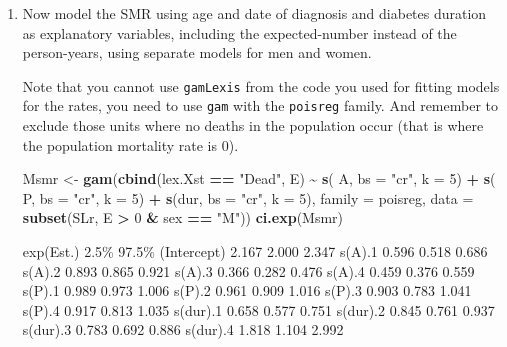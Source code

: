 \documentclass[
]{book}
\newenvironment{Shaded}{\begin{snugshade}}{\end{snugshade}}
\newcommand{\AttributeTok}[1]{\textcolor[rgb]{0.13,0.29,0.53}{#1}}
\newcommand{\DecValTok}[1]{\textcolor[rgb]{0.00,0.00,0.81}{#1}}
\newcommand{\FunctionTok}[1]{\textcolor[rgb]{0.13,0.29,0.53}{\textbf{#1}}}
\newcommand{\NormalTok}[1]{#1}
\newcommand{\OtherTok}[1]{\textcolor[rgb]{0.56,0.35,0.01}{#1}}
\newcommand{\SpecialCharTok}[1]{\textcolor[rgb]{0.81,0.36,0.00}{\textbf{#1}}}
\newcommand{\StringTok}[1]{\textcolor[rgb]{0.31,0.60,0.02}{#1}}
\begin{document}
\begin{enumerate}
\def\labelenumi{\arabic{enumi}.}
\setcounter{enumi}{13}
\item
  Now model the SMR using age and date of diagnosis and diabetes
  duration as explanatory variables, including the expected-number
  instead of the person-years, using separate models for
  men and women.

  Note that you cannot use \texttt{gamLexis} from the code you used for
  fitting models for the rates, you need to use \texttt{gam} with
  the \texttt{poisreg} family. And remember to exclude those units
  where no deaths in the population occur (that is where the
  population mortality rate is 0).

\begin{Shaded}
\begin{Highlighting}[]
\NormalTok{Msmr }\OtherTok{\textless{}{-}} \FunctionTok{gam}\NormalTok{(}\FunctionTok{cbind}\NormalTok{(lex.Xst }\SpecialCharTok{==} \StringTok{"Dead"}\NormalTok{, E)}
            \SpecialCharTok{\textasciitilde{}} \FunctionTok{s}\NormalTok{(  A, }\AttributeTok{bs =} \StringTok{"cr"}\NormalTok{, }\AttributeTok{k =} \DecValTok{5}\NormalTok{) }\SpecialCharTok{+}
              \FunctionTok{s}\NormalTok{(  P, }\AttributeTok{bs =} \StringTok{"cr"}\NormalTok{, }\AttributeTok{k =} \DecValTok{5}\NormalTok{) }\SpecialCharTok{+}
              \FunctionTok{s}\NormalTok{(dur, }\AttributeTok{bs =} \StringTok{"cr"}\NormalTok{, }\AttributeTok{k =} \DecValTok{5}\NormalTok{),}
            \AttributeTok{family =}\NormalTok{ poisreg,}
              \AttributeTok{data =} \FunctionTok{subset}\NormalTok{(SLr, E }\SpecialCharTok{\textgreater{}} \DecValTok{0} \SpecialCharTok{\&}\NormalTok{ sex }\SpecialCharTok{==} \StringTok{"M"}\NormalTok{))}
\FunctionTok{ci.exp}\NormalTok{(Msmr)}
\end{Highlighting}
\end{Shaded}

\begin{Shaded}
\begin{Highlighting}[]
\NormalTok{            exp(Est.)  2.5\% 97.5\%}
\NormalTok{(Intercept)     2.167 2.000 2.347}
\NormalTok{s(A).1          0.596 0.518 0.686}
\NormalTok{s(A).2          0.893 0.865 0.921}
\NormalTok{s(A).3          0.366 0.282 0.476}
\NormalTok{s(A).4          0.459 0.376 0.559}
\NormalTok{s(P).1          0.989 0.973 1.006}
\NormalTok{s(P).2          0.961 0.909 1.016}
\NormalTok{s(P).3          0.903 0.783 1.041}
\NormalTok{s(P).4          0.917 0.813 1.035}
\NormalTok{s(dur).1        0.658 0.577 0.751}
\NormalTok{s(dur).2        0.845 0.761 0.937}
\NormalTok{s(dur).3        0.783 0.692 0.886}
\NormalTok{s(dur).4        1.818 1.104 2.992}
\end{Highlighting}
\end{Shaded}


\end{enumerate}
\end{document}

